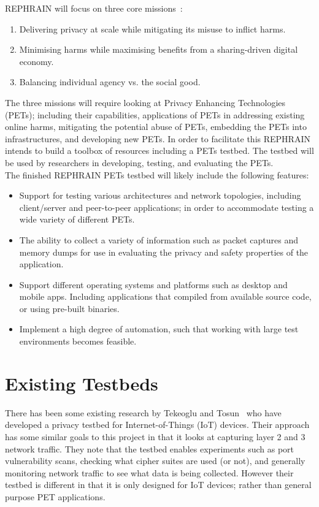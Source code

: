 \documentclass[
    author={Jacob Daniel Halsey},
    supervisor={Prof. Awais Rashid},
    degree={BSc},
    title={Building a Testbed for Evaluating Privacy Enhancing Technologies  (PETs)},
    subtitle={},
    type={software development},
    year={2021}
]{dissertation}
\begin{document}
REPHRAIN will focus on three core missions~\cite{rephrain_missions}:

\begin{enumerate}
	\item Delivering privacy at scale while mitigating its misuse to inflict harms.
	\item Minimising harms while maximising benefits from a sharing-driven digital economy.
	\item Balancing individual agency vs. the social good.
\end{enumerate}

The three missions will require looking at Privacy Enhancing Technologies (PETs); including their capabilities,
applications of PETs in addressing existing online harms, mitigating the potential abuse of PETs, embedding the PETs
into infrastructures, and developing new PETs.
In order to facilitate this REPHRAIN intends to build a toolbox of resources including a PETs testbed. The testbed
will be used by researchers in developing, testing, and evaluating the PETs.\\

The finished REPHRAIN PETs testbed will likely include the following features:

\begin{itemize}
	\item Support for testing various architectures and network topologies, 
	including client/server and peer-to-peer applications; in order to accommodate 
	testing a wide variety of different PETs.
	\item The ability to collect a variety of information such as packet captures and memory dumps
	for use in evaluating the privacy and safety properties of the application.
	\item Support different operating systems and platforms such as desktop and mobile apps.
	Including applications that compiled from available source code, or using pre-built binaries.
	\item Implement a high degree of automation, such that working with large test
	environments becomes feasible.
\end{itemize}

\section{Existing Testbeds}

There has been some existing research by Tekeoglu and Tosun~\cite{tekeoglu_2016_testbed} who have developed 
a privacy testbed for Internet-of-Things (IoT) devices. Their approach has some similar goals to this project 
in that it looks at capturing layer 2 and 3 network traffic. They note that the testbed enables experiments such
as port vulnerability scans, checking what cipher suites are used (or not), and generally monitoring 
network traffic to see what data is being collected. However their testbed is different in that it is only designed
for IoT devices; rather than general purpose PET applications.
\end{document}
